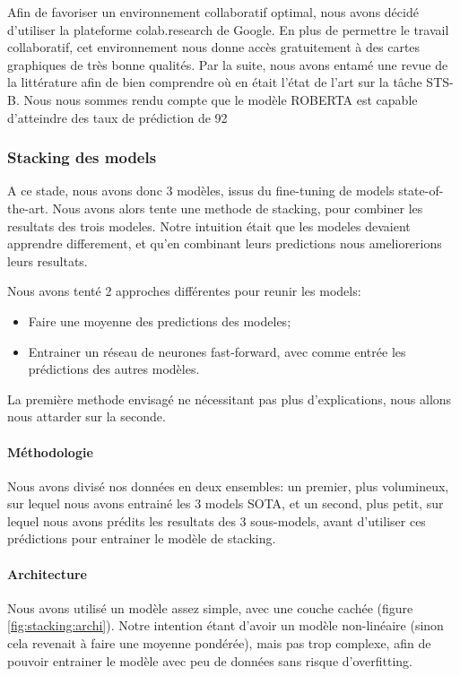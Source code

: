 \documentclass[11pt,a4paper, french]{article}
\begin{document}
Afin de favoriser un environnement collaboratif optimal, nous avons décidé d’utiliser la plateforme colab.research de Google. En plus de permettre le travail collaboratif, cet environnement nous donne accès gratuitement à des cartes graphiques de très bonne qualités. Par la suite, nous avons entamé une revue de la littérature afin de bien comprendre où en était l’état de l’art sur la tâche STS-B. Nous nous sommes rendu compte que le modèle ROBERTA est capable d’atteindre des taux de prédiction de 92 %


\subsubsection{Stacking des models}

A ce stade, nous avons donc 3 modèles, issus du fine-tuning de models state-of-the-art. Nous avons alors tente une methode de stacking, pour combiner les resultats des trois modeles. Notre intuition était que les modeles devaient apprendre differement, et qu'en combinant leurs predictions nous ameliorerions leurs resultats.

Nous avons tenté 2 approches différentes pour reunir les models:

\begin{itemize}
  \item Faire une moyenne des predictions des modeles;
  \item Entrainer un réseau de neurones fast-forward, avec comme entrée les prédictions des autres modèles.
\end{itemize}

La première methode envisagé ne nécessitant pas plus d'explications, nous allons nous attarder sur la seconde.

\paragraph{Méthodologie} Nous avons divisé nos données en deux ensembles: un premier, plus volumineux, sur lequel nous avons entrainé les 3 models SOTA, et un second, plus petit, sur lequel nous avons prédits les resultats des 3 sous-models, avant d'utiliser ces prédictions pour entrainer le modèle de stacking.

\paragraph{Architecture} Nous avons utilisé un modèle assez simple, avec une couche cachée (figure \ref{fig:stacking:archi}). Notre intention étant d'avoir un modèle non-linéaire (sinon cela revenait à faire une moyenne pondérée), mais pas trop complexe, afin de pouvoir entrainer le modèle avec peu de données sans risque d'overfitting.
\end{document}
